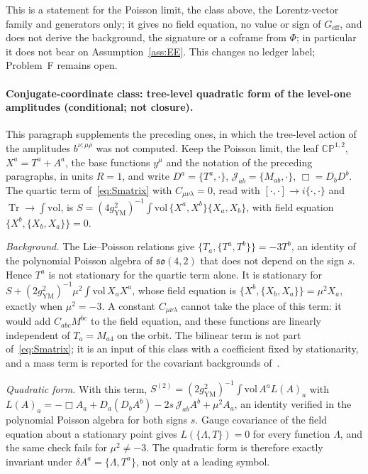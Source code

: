 This is a statement for the Poisson limit, the class above, the Lorentz-vector family and generators only; it gives no field equation, no value or sign of \(G_{\mathrm{eff}}\), and does not derive the background, the signature or a coframe from \(\Phi\); in particular it does not bear on Assumption~\ref{ass:EE}. This changes no ledger label; Problem~F remains open.

\paragraph{Conjugate-coordinate class: tree-level quadratic form of the level-one amplitudes (conditional; not closure).}
This paragraph supplements the preceding ones, in which the tree-level action of the amplitudes \(b^{\nu;\mu\rho}\) was not computed. Keep the Poisson limit, the leaf \(\mathbb{CP}^{1,2}\), \(X^a=T^a+A^a\), the base functions \(y^\mu\) and the notation of the preceding paragraphs, in units \(R=1\), and write \(D^a=\{T^a,\cdot\}\), \(\mathcal J_{ab}=\{M_{ab},\cdot\}\), \(\Box=D_bD^b\). The quartic term of~\eqref{eq:Smatrix} with \(C_{\mu\nu\lambda}=0\), read with \([\cdot,\cdot]\to i\{\cdot,\cdot\}\) and \(\operatorname{Tr}\to\int\mathrm{vol}\), is \(S=(4g_{\mathrm{YM}}^2)^{-1}\int\mathrm{vol}\,\{X^a,X^b\}\{X_a,X_b\}\), with field equation \(\{X^b,\{X_b,X_a\}\}=0\).

\emph{Background.} The Lie--Poisson relations give \(\{T_a,\{T^a,T^b\}\}=-3T^b\), an identity of the polynomial Poisson algebra of \(\mathfrak{so}(4,2)\) that does not depend on the sign \(s\). Hence \(T^a\) is not stationary for the quartic term alone. It is stationary for \(S+(2g_{\mathrm{YM}}^2)^{-1}\mu^2\int\mathrm{vol}\,X_aX^a\), whose field equation is \(\{X^b,\{X_b,X_a\}\}=\mu^2X_a\), exactly when \(\mu^2=-3\). A constant \(C_{\mu\nu\lambda}\) cannot take the place of this term: it would add \(C_{abc}M^{bc}\) to the field equation, and these functions are linearly independent of \(T_a=M_{a4}\) on the orbit. The bilinear term is not part of~\eqref{eq:Smatrix}; it is an input of this class with a coefficient fixed by stationarity, and a mass term is reported for the covariant backgrounds of~\cite{SperlingSteinacker2019}.

\emph{Quadratic form.} With this term, \(S^{(2)}=(2g_{\mathrm{YM}}^2)^{-1}\int\mathrm{vol}\,A^aL(A)_a\) with \(L(A)_a=-\Box A_a+D_a(D_bA^b)-2s\,\mathcal J_{ab}A^b+\mu^2A_a\), an identity verified in the polynomial Poisson algebra for both signs \(s\). Gauge covariance of the field equation about a stationary point gives \(L(\{\Lambda,T\})=0\) for every function \(\Lambda\), and the same check fails for \(\mu^2\neq-3\). The quadratic form is therefore exactly invariant under \(\delta A^a=\{\Lambda,T^a\}\), not only at a leading symbol.

